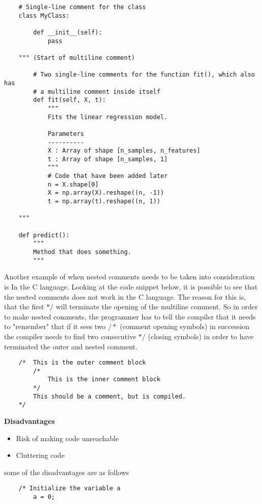 \begin{verbatim}
    # Single-line comment for the class
    class MyClass:

        def __init__(self):
            pass
    
    """ (Start of multiline comment)

        # Two single-line comments for the function fit(), which also has
        # a multiline comment inside itself
        def fit(self, X, t):
            """
            Fits the linear regression model.

            Parameters
            ----------
            X : Array of shape [n_samples, n_features]
            t : Array of shape [n_samples, 1]
            """        
            # Code that have been added later
            n = X.shape[0]
            X = np.array(X).reshape((n, -1))
            t = np.array(t).reshape((n, 1))

    """

    def predict():
        """
        Method that does something.
        """
\end{verbatim}

Another example of when nested comments needs to be taken into consideration is In
the C language. Looking at the code snippet below, it is possible to see that 
the nested comments does not work in the C language. The reason for this is, that
the first $*/$ will terminate the opening of the multiline comment. So in order to make
nested comments, the programmer has to tell the compiler that it needs to "remember" that
if it sees two $/*$ (comment opening symbols) in succession the compiler needs to find two 
consecutive $*/$ (closing symbols) in order to have terminated the outer and nested comment. 

\begin{verbatim}
    /*  This is the outer comment block
        /* 
            This is the inner comment block
        */
        This should be a comment, but is compiled.
    */ 
\end{verbatim}

\noindent
\textbf{Disadvantages}
\begin{itemize}
    \item Risk of making code unreachable
    \item Cluttering code 
\end{itemize}
some of the disadvantages are as follows

\begin{verbatim}
    /* Initialize the variable a
        a = 0;

    \end{verbatim}

